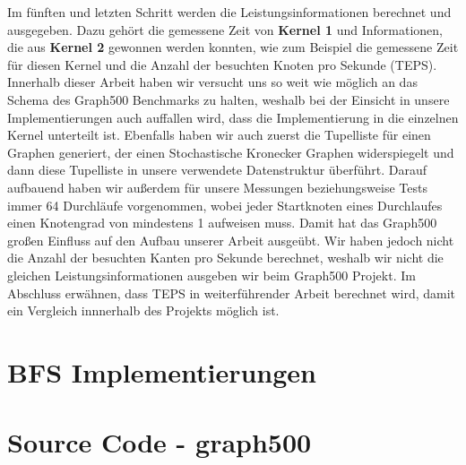 \documentclass[11pt,a4paper]{article}
\begin{document}
Im fünften und letzten Schritt werden die Leistungsinformationen berechnet und ausgegeben. Dazu gehört die gemessene Zeit von \textbf{Kernel 1} und Informationen, die aus \textbf{Kernel 2} gewonnen werden konnten, wie zum Beispiel die gemessene Zeit für diesen Kernel und die Anzahl der besuchten Knoten pro Sekunde (TEPS).\\
Innerhalb dieser Arbeit haben wir versucht uns so weit wie möglich an das Schema des Graph500 Benchmarks zu halten, weshalb bei der Einsicht in unsere Implementierungen auch auffallen wird, dass die Implementierung in die einzelnen Kernel unterteilt ist. Ebenfalls haben wir auch zuerst die Tupelliste für einen Graphen generiert, der einen Stochastische Kronecker Graphen widerspiegelt und dann diese Tupelliste in unsere verwendete Datenstruktur überführt. Darauf aufbauend haben wir außerdem für unsere Messungen beziehungsweise Tests immer 64 Durchläufe vorgenommen, wobei jeder Startknoten eines Durchlaufes einen Knotengrad von mindestens 1 aufweisen muss. Damit hat das Graph500 großen Einfluss auf den Aufbau unserer Arbeit ausgeübt. Wir haben jedoch nicht die Anzahl der besuchten Kanten pro Sekunde berechnet, weshalb wir nicht die gleichen Leistungsinformationen ausgeben wir beim Graph500 Projekt.
Im Abschluss erwähnen, dass TEPS in weiterführender Arbeit berechnet wird, damit ein Vergleich innnerhalb des Projekts möglich ist.
\clearpage


\clearpage
\appendix
\section{BFS Implementierungen}
\label{sec:versions}


\section{Source Code - graph500}
\label{sec:sourcecode}

\clearpage

\clearpage


\clearpage
\end{document}
